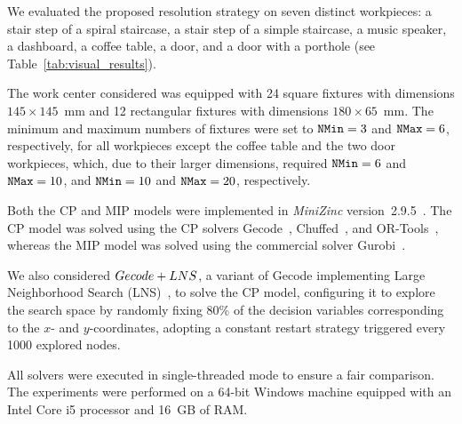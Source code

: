 \label{sec:result_analysis}

We evaluated the proposed resolution strategy on seven distinct workpieces: a stair step of a spiral staircase, a stair step of a simple staircase, a music speaker, a dashboard, a coffee table, a door, and a door with a porthole (see Table~\ref{tab:visual_results}).

The work center considered was equipped with 24 square fixtures with dimensions \(145 \times 145\)~mm and 12 rectangular fixtures with dimensions \(180 \times 65\)~mm. The minimum and maximum numbers of fixtures were set to \(\mathtt{NMin} = 3\) and \(\mathtt{NMax} = 6\), respectively, for all workpieces except the coffee table and the two door workpieces, which, due to their larger dimensions, required \(\mathtt{NMin} = 6\) and \(\mathtt{NMax} = 10\), and \(\mathtt{NMin} = 10\) and \(\mathtt{NMax} = 20\), respectively.

Both the CP and MIP models were implemented in \textit{MiniZinc} version~2.9.5~\cite{nethercote2007MiniZinc}. The CP model was solved using the CP solvers Gecode~\cite{schulte2006gecode}, Chuffed~\cite{chuffed}, and OR-Tools~\cite{ortools}, whereas the MIP model was solved using the commercial solver Gurobi~\cite{gurobi}.

We also considered \(Gecode+LNS\), a variant of Gecode implementing Large Neighborhood Search (LNS)~\cite{pisinger2018large}, to solve the CP model, configuring it to explore the search space by randomly fixing 80\% of the decision variables corresponding to the \(x\)- and \(y\)-coordinates, adopting a constant restart strategy triggered every 1000 explored nodes.

All solvers were executed in single-threaded mode to ensure a fair comparison. The experiments were performed on a 64-bit Windows machine equipped with an Intel Core i5 processor and 16~GB of RAM.

